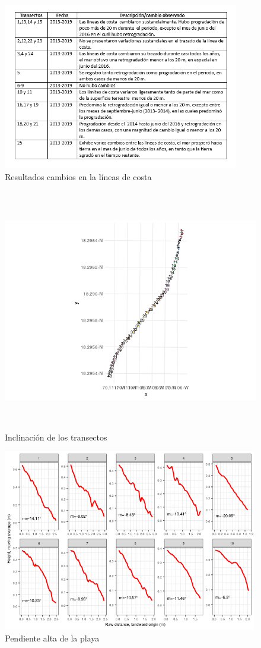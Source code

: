 \documentclass[11pt,]{article}
\begin{document}
\begin{figure}
\centering
\includegraphics[height=2.86458in]{resultados_cambio_lineas.png}
\caption{Resultados cambios en la líneas de costa\label{resultados}}
\end{figure}

\begin{figure}
\centering
\includegraphics[height=4.16667in]{pendiente_dimension.png}
\caption{Inclinación de los transectos\label{dimension}}
\end{figure}

\begin{figure}
\centering
\includegraphics[height=3.12500in]{pendiente.png}
\caption{Pendiente alta de la playa\label{alta}}
\end{figure}
\end{document}
